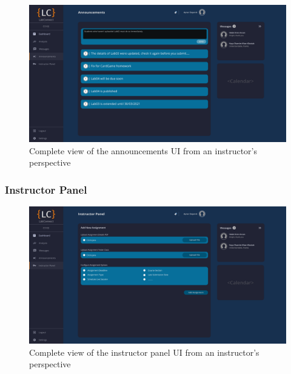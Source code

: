 \documentclass[a4paper, 12pt]{article}
\begin{document}
    \begin{figure}[H]
        \centering
        \includegraphics[width=\textwidth]{instructor_announcements}
        \caption{Complete view of the announcements UI from an instructor's perspective}
        \label{fig:instructor_announcements_full}
    \end{figure}
    

    
    
    
    
    
    
    
    
    
    
    \pagebreak
    
    \subsubsection{Instructor Panel}
    
    \begin{figure}[H]
        \centering
        \includegraphics[width=\textwidth]{instructor_admin_panel}
        \caption{Complete view of the instructor panel UI from an instructor's perspective}
        \label{fig:instructor_admin_panel_full}
    \end{figure}
    
\end{document}
